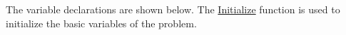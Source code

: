 The variable declarations are shown below. The \url{Initialize} function is used to initialize the basic variables of the problem.
